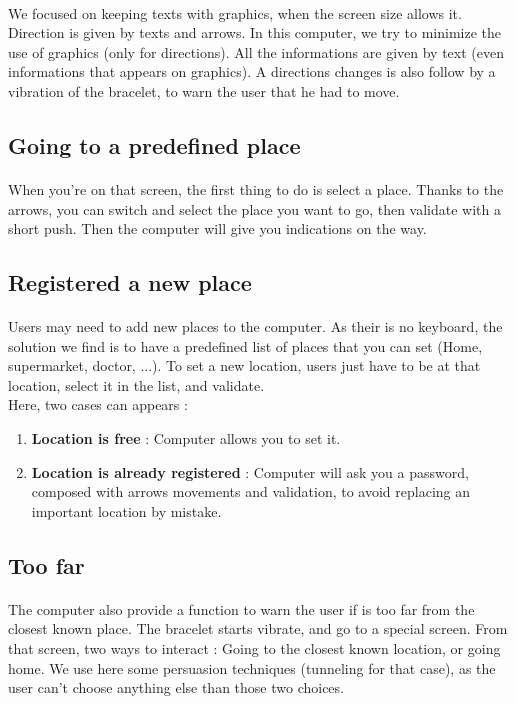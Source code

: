 \documentclass[a4paper,11pt]{article} %
\begin{document}
\paragraph{}We focused on keeping texts with graphics, when the screen size allows it. Direction is given by texts and arrows. In this computer, we try to minimize the use of graphics (only for directions). All the informations are given by text (even informations that appears on graphics). A directions changes is also follow by a vibration of the bracelet, to warn the user that he had to move.
\subsection{Going to a predefined place}
\paragraph{} When you're on that screen, the first thing to do is select a place. Thanks to the arrows, you can switch and select the place you want to go, then validate with a short push. Then the computer will give you indications on the way.
\subsection{Registered a new place}
\paragraph{}Users may need to add new places to the computer. As their is no keyboard, the solution we find is to have a predefined list of places that you can set (Home, supermarket, doctor, ...). To set a new location, users just have to be at that location, select it in the list, and validate.\\
Here, two cases can appears : 
\begin{enumerate}
\item \textbf{Location is free} : Computer allows you to set it.
\item \textbf{Location is already registered} : Computer will ask you a password, composed with arrows movements and validation, to avoid replacing an important location by mistake. 
\end{enumerate}

\subsection{Too far}
\paragraph{}The computer also provide a function to warn the user if is too far from the closest known place. The bracelet starts vibrate, and go to a special screen. From that screen, two ways to interact : Going to the closest known location, or going home. We use here some persuasion techniques (tunneling for that case), as the user can't choose anything else than those two choices.
\end{document}
